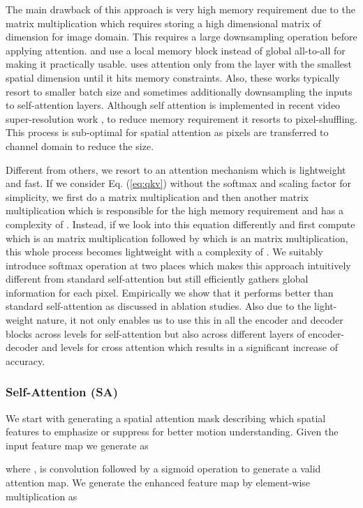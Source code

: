 \documentclass[10pt,twocolumn,letterpaper]{article}
\begin{document}
The main drawback of this approach is very high memory requirement due to the matrix multiplication  which requires storing a high dimensional matrix of dimension  for image domain. This requires a large downsampling operation before applying attention. \cite{parmar2018image} and \cite{ramachandran2019stand} use a local memory block instead of global all-to-all for making it practically usable. \cite{bello2019attention} uses attention only from the layer with the smallest spatial dimension until it hits memory constraints. Also, these works typically resort to smaller batch size and sometimes additionally downsampling the inputs to self-attention layers. Although self attention is implemented in recent video super-resolution work \cite{yi2019progressive}, to reduce memory requirement it resorts to pixel-shuffling. This process is sub-optimal for spatial attention as pixels are transferred to channel domain to reduce the size.
\par Different from others, we resort to an attention mechanism which is lightweight and fast. If we consider Eq. (\ref{eq:qkv}) without the softmax and scaling factor for simplicity, we first do a  matrix multiplication and then another  matrix multiplication which is responsible for the high memory requirement and has a complexity of . Instead, if we look into this equation differently and first compute  which is an  matrix multiplication followed by  which is an  matrix multiplication, this whole process becomes lightweight with a complexity of . We suitably introduce softmax operation at two places which makes this approach intuitively different from standard self-attention but still efficiently gathers global information for each pixel. Empirically we show that it performs better than standard self-attention as discussed in ablation studies. Also due to the light-weight nature, it not only enables us to use this in all the encoder and decoder blocks across levels for self-attention but also across different layers of encoder-decoder and levels for cross attention which results in a significant increase of accuracy. 
\subsubsection{Self-Attention (SA)}
We start with generating a spatial attention mask  describing which spatial features to emphasize or suppress for better motion understanding. Given the input feature map  we generate  as

where ,  is convolution followed by a sigmoid operation to generate a valid attention map. We generate the enhanced feature map  by element-wise multiplication as
\end{document}
